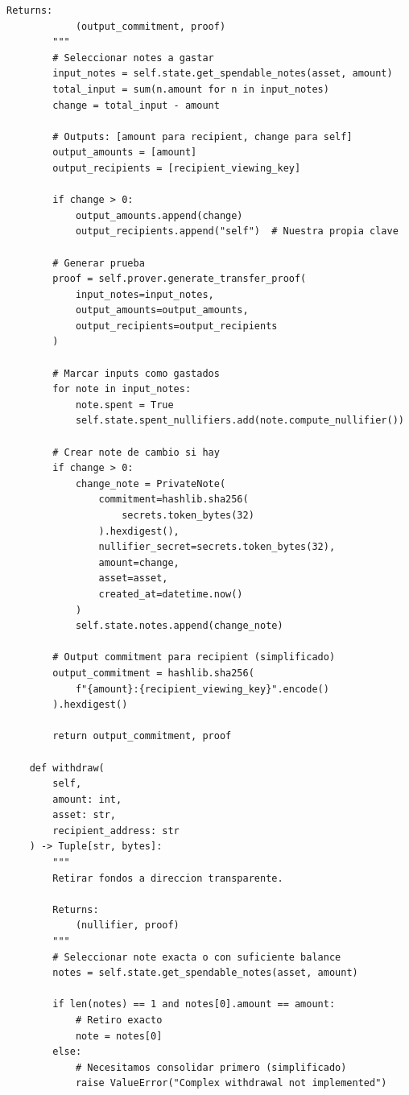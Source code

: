 \documentclass[11pt,a4paper,twoside]{book}
\theoremstyle{definition}
\theoremstyle{remark}
\begin{document}
\begin{lstlisting}[style=python, caption={Arquitectura de wallet con soporte ZK}]
        Returns:
            (output_commitment, proof)
        """
        # Seleccionar notes a gastar
        input_notes = self.state.get_spendable_notes(asset, amount)
        total_input = sum(n.amount for n in input_notes)
        change = total_input - amount
        
        # Outputs: [amount para recipient, change para self]
        output_amounts = [amount]
        output_recipients = [recipient_viewing_key]
        
        if change > 0:
            output_amounts.append(change)
            output_recipients.append("self")  # Nuestra propia clave
        
        # Generar prueba
        proof = self.prover.generate_transfer_proof(
            input_notes=input_notes,
            output_amounts=output_amounts,
            output_recipients=output_recipients
        )
        
        # Marcar inputs como gastados
        for note in input_notes:
            note.spent = True
            self.state.spent_nullifiers.add(note.compute_nullifier())
        
        # Crear note de cambio si hay
        if change > 0:
            change_note = PrivateNote(
                commitment=hashlib.sha256(
                    secrets.token_bytes(32)
                ).hexdigest(),
                nullifier_secret=secrets.token_bytes(32),
                amount=change,
                asset=asset,
                created_at=datetime.now()
            )
            self.state.notes.append(change_note)
        
        # Output commitment para recipient (simplificado)
        output_commitment = hashlib.sha256(
            f"{amount}:{recipient_viewing_key}".encode()
        ).hexdigest()
        
        return output_commitment, proof
    
    def withdraw(
        self,
        amount: int,
        asset: str,
        recipient_address: str
    ) -> Tuple[str, bytes]:
        """
        Retirar fondos a direccion transparente.
        
        Returns:
            (nullifier, proof)
        """
        # Seleccionar note exacta o con suficiente balance
        notes = self.state.get_spendable_notes(asset, amount)
        
        if len(notes) == 1 and notes[0].amount == amount:
            # Retiro exacto
            note = notes[0]
        else:
            # Necesitamos consolidar primero (simplificado)
            raise ValueError("Complex withdrawal not implemented")
        

\end{lstlisting}
\end{document}
